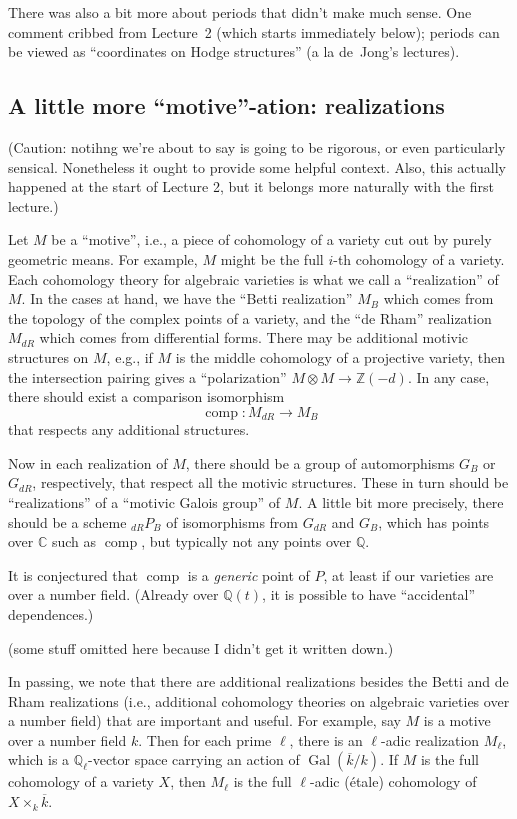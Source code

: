 \documentclass[12pt]{article}
\def\CC{\mathbb{C}}
\def\QQ{\mathbb{Q}}
\def\ZZ{\mathbb{Z}}
\DeclareMathOperator{\comp}{comp}
\DeclareMathOperator{\Gal}{Gal}
\begin{document}
There was also a bit more about periods that didn't make much sense. One
comment cribbed from Lecture~2 (which starts immediately below);
periods can be viewed as ``coordinates
on Hodge structures'' (a la de~Jong's lectures).

\subsection*{A little more ``motive''-ation: realizations}

(Caution: notihng we're about to say is going to be rigorous, or even
particularly sensical. Nonetheless it ought to provide some helpful context.
Also, this actually happened at the start of Lecture 2, but it belongs more
naturally with the first lecture.)

Let $M$ be a ``motive'', i.e., a piece of cohomology of a variety cut out
by purely geometric means. For example, $M$ might be the full $i$-th cohomology
of a variety. Each cohomology theory for algebraic varieties is
what we call a ``realization'' of $M$. In the cases at hand, we
have the ``Betti realization'' $M_B$ which comes from the topology of the
complex points of a variety, and the ``de Rham'' realization $M_{dR}$ which
comes from differential forms. There may be additional motivic structures
on $M$, e.g., if $M$ is the middle cohomology of a projective variety,
then the intersection pairing gives a ``polarization'' $M \otimes M
\to \ZZ(-d)$. 
In any case, there should exist a comparison isomorphism
\[
\comp: M_{dR} \to M_B
\]
that respects any additional structures.

Now in each realization of $M$, there should be a group of automorphisms
$G_B$ or $G_{dR}$, respectively, that respect all the motivic structures.
These in turn should be ``realizations'' of a ``motivic Galois group''
of $M$. A little bit more precisely, there should be a scheme
$ _{dR}P_B$ of isomorphisms from $G_{dR}$ and $G_B$, which has points over
$\CC$ such as $\comp$, but typically not any points over $\QQ$.

It is conjectured that $\comp$ is a \emph{generic} point of $P$, at least
if our varieties are over a number field. (Already over $\QQ(t)$, it is
possible to have ``accidental'' dependences.)

(some stuff omitted here because I didn't get it written down.)

In passing, we note that there are additional realizations besides the
Betti and de Rham realizations (i.e., additional cohomology theories on
algebraic varieties over a number field) that are important and useful.
For example, say $M$ is a motive over a number field $k$. Then for each
prime $\ell$, there is an $\ell$-adic realization $M_{\ell}$, which is
a $\QQ_\ell$-vector space carrying an action of $\Gal(\overline{k}/k)$.
If $M$ is the full cohomology of a variety $X$, then $M_{\ell}$ is the
full $\ell$-adic (\'etale) cohomology of $X \times_k \overline{k}$.
\end{document}
